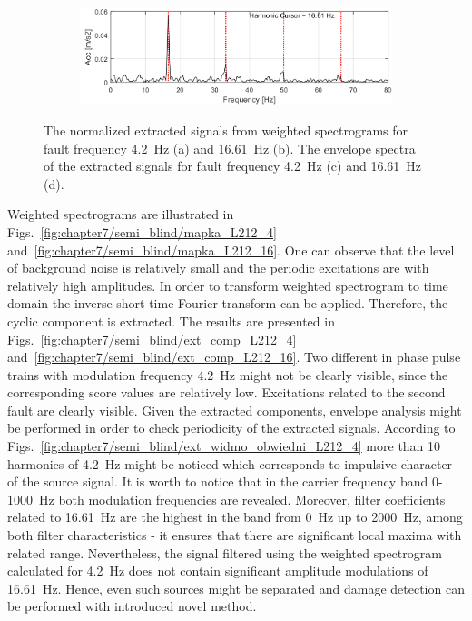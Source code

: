 \begin{figure}[!ht]
        \begin{subfigure}[b]{0.49\textwidth}
        \centering
        \captionsetup{skip=0.01pt}
        \caption{}
        \includegraphics[width=\textwidth]{wykresy/chapter_application/semi_blind/widmo_obwiedniL212_16.png}
        \label{fig:chapter7/semi_blind/ext_widmo_obwiedni_L212_16}
    \end{subfigure}
    \vspace{\baselineskip}
    \caption{The normalized extracted signals from weighted spectrograms for fault frequency 4.2~Hz (a) and 16.61~Hz (b). The envelope spectra of the extracted signals for fault frequency 4.2~Hz (c) and 16.61~Hz (d). }\label{fig:chapter7/semi_blind/signal_ext}
\end{figure} 


Weighted spectrograms are illustrated in Figs.~\ref{fig:chapter7/semi_blind/mapka_L212_4} and~\ref{fig:chapter7/semi_blind/mapka_L212_16}. One can observe that the level of background noise is relatively small and the periodic excitations are with relatively high amplitudes.  In order to transform weighted spectrogram to time domain the inverse short-time Fourier transform can be applied. Therefore, the cyclic component is extracted. The results are presented in Figs.~\ref{fig:chapter7/semi_blind/ext_comp_L212_4} and~\ref{fig:chapter7/semi_blind/ext_comp_L212_16}. Two different in phase pulse trains with modulation frequency 4.2~Hz might not be clearly visible, since the corresponding score values are relatively low. Excitations related to the second fault are clearly visible. Given the extracted components, envelope analysis might be performed in order to check periodicity of the extracted signals. According to Figs.~\ref{fig:chapter7/semi_blind/ext_widmo_obwiedni_L212_4} more than 10 harmonics of 4.2~Hz might be noticed which corresponds to impulsive character of the source signal. It is worth to notice that in the carrier frequency band 0-1000~Hz both modulation frequencies are revealed. Moreover, filter coefficients related to 16.61~Hz are the highest in the band from 0~Hz up to 2000~Hz, among both filter characteristics - it ensures that there are significant local maxima with related range. Nevertheless, the signal filtered using the weighted spectrogram calculated for 4.2~Hz does not contain significant amplitude modulations of 16.61~Hz. Hence, even such sources might be separated and damage detection can be performed with introduced novel method.